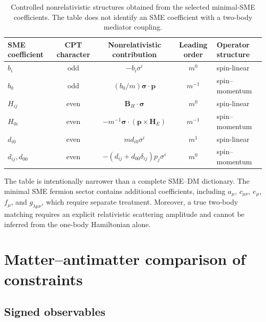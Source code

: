 \documentclass[aps,prd,reprint,superscriptaddress,nofootinbib]{revtex4-2}
\begin{document}
	\begin{table}[t]
		\caption{Controlled nonrelativistic structures obtained from the
			selected minimal-SME coefficients. The table does not identify an SME
			coefficient with a two-body mediator coupling.}
		\label{tab:matching}
		\begin{ruledtabular}
			\begin{tabular}{lcccl}
				SME coefficient & CPT character & Nonrelativistic contribution
				& Leading order & Operator structure\\
				\hline
				$b_i$
				& odd
				& $-b_i\sigma^i$
				& $m^0$
				& spin-linear
				\\
				$b_0$
				& odd
				& $(b_0/m)\boldsymbol{\sigma}\cdot\mathbf p$
				& $m^{-1}$
				& spin--momentum
				\\
				$H_{ij}$
				& even
				& $\mathbf B_H\cdot\boldsymbol{\sigma}$
				& $m^0$
				& spin-linear
				\\
				$H_{0i}$
				& even
				& $-m^{-1}\boldsymbol{\sigma}\cdot
				(\mathbf p\times\mathbf H_E)$
				& $m^{-1}$
				& spin--momentum
				\\
				$d_{i0}$
				& even
				& $m d_{i0}\sigma^i$
				& $m^1$
				& spin-linear
				\\
				$d_{ij},d_{00}$
				& even
				& $-(d_{ij}+d_{00}\delta_{ij})p_j\sigma^i$
				& $m^0$
				& spin--momentum
			\end{tabular}
		\end{ruledtabular}
	\end{table}
	
	The table is intentionally narrower than a complete SME--DM
	dictionary. The minimal SME fermion sector contains additional
	coefficients, including $a_\mu$, $c_{\mu\nu}$, $e_\mu$, $f_\mu$, and
	$g_{\lambda\mu\nu}$, which require separate treatment. Moreover, a
	true two-body matching requires an explicit relativistic scattering
	amplitude and cannot be inferred from the one-body Hamiltonian alone.
	
	\section{Matter--antimatter comparison of constraints}
	
	\subsection{Signed observables}
	
\end{document}
